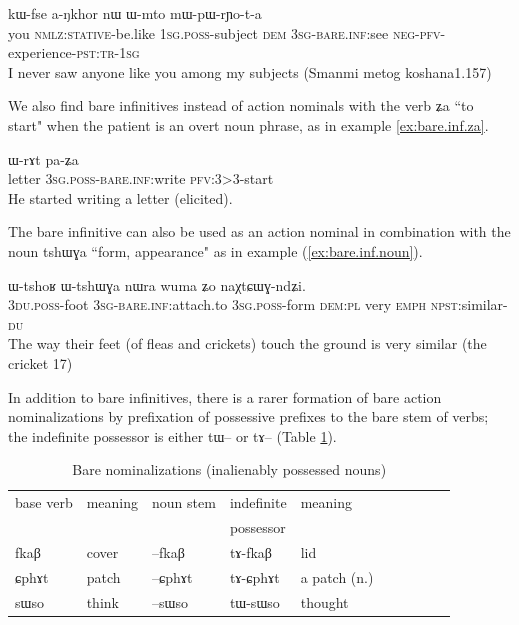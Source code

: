 \documentclass[oldfontcommands,oneside,a4paper,11pt]{article}
\newcommand{\ipa}[1]{{\phon \mbox{#1}}} %
\begin{document}
\begin{exe}
\ex \label{ex:bare.inf}
\gll \ipa{nɤʑo} 	\ipa{kɯ-fse} 	\ipa{a-ŋkhor} 	\ipa{nɯ} 	\ipa{ɯ-mto} 	\ipa{mɯ-pɯ-rɲo-t-a} \\
you \textsc{nmlz:stative}-be.like \textsc{1sg.poss}-subject \textsc{dem} \textsc{3sg}-\textsc{bare.inf:}see \textsc{neg-pfv}-experience-\textsc{pst:tr-1sg} \\
\glt I never saw anyone like you among my subjects (Smanmi metog koshana1.157)
\end{exe}

We also find bare infinitives instead of action nominals with the verb \ipa{ʑa} ``to start" when the patient is an overt noun phrase, as in example \ref{ex:bare.inf.za}.

\begin{exe}
\ex \label{ex:bare.inf.za}
\gll \ipa{tɤscoz} 	\ipa{ɯ-rɤt} 	\ipa{pa-ʑa} 	  \\
letter \textsc{3sg.poss}-\textsc{bare.inf:}write \textsc{pfv:3>3}-start\\
\glt  He started writing a letter (elicited).
\end{exe}

 
The bare infinitive can also be used as an action nominal in combination with the noun \ipa{tshɯɣa} ``form, appearance" as in example (\ref{ex:bare.inf.noun}).

\begin{exe}
\ex \label{ex:bare.inf.noun}
\gll \ipa{ndʑi-mi}   	\ipa{ɯ-tshoʁ}   	\ipa{ɯ-tshɯɣa}   	\ipa{nɯra}   	\ipa{wuma}   	\ipa{ʑo}   	\ipa{naχtɕɯɣ-ndʑi.}   \\
\textsc{3du.poss}-foot \textsc{3sg}-\textsc{bare.inf:}attach.to \textsc{3sg.poss}-form \textsc{dem:pl} very \textsc{emph}  \textsc{npst}:similar-\textsc{du}  \\
\glt The way their feet (of fleas and crickets) touch the ground is very similar (the cricket 17)
\end{exe}

In addition to bare infinitives, there is a rarer formation of bare action nominalizations by prefixation of possessive prefixes to the bare stem of verbs; the indefinite possessor is either \ipa{tɯ}-- or \ipa{tɤ}-- (Table \ref{tab:nmlz-inalienably}). 

\begin{table}[H]
\caption{Bare nominalizations (inalienably possessed nouns)} \label{tab:nmlz-inalienably}
\begin{tabular}{llllllllll}
\toprule
base verb & meaning & noun stem & indefinite  & meaning\\
&&&possessor\\
\midrule
\ipa{fkaβ} & cover& \ipa{--fkaβ} & \ipa{tɤ-fkaβ} & lid\\
\ipa{ɕphɤt} & patch& \ipa{--ɕphɤt} & \ipa{tɤ-ɕphɤt} & a patch (n.) \\
\ipa{sɯso} & think & \ipa{--sɯso} & \ipa{tɯ-sɯso} & thought \\
\bottomrule
\end{tabular}
\end{table}
\end{document}
